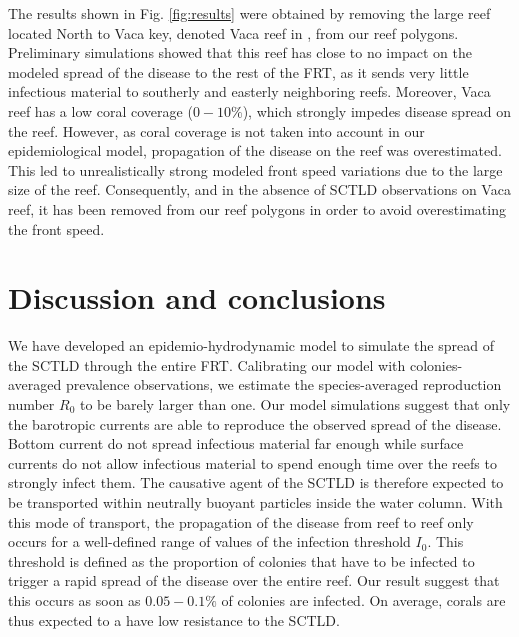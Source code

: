 \documentclass[utf8]{frontiersSCNS}
\begin{document}
The results shown in Fig. \ref{fig:results} were obtained by removing the large reef located North to Vaca key, denoted Vaca reef in \cite{frys20}, from our reef polygons. Preliminary simulations showed that this reef has close to no impact on the modeled spread of the disease to the rest of the FRT, as it sends very little infectious material to southerly and easterly neighboring reefs. Moreover, Vaca reef has a low coral coverage ($0-10\%$), which strongly impedes disease spread on the reef. However, as coral coverage is not taken into account in our epidemiological model, propagation of the disease on the reef was overestimated. This led to unrealistically strong modeled front speed variations due to the large size of the reef. Consequently, and in the absence of SCTLD observations on Vaca reef, it has been removed from our reef polygons in order to avoid overestimating the front speed.



\section{Discussion and conclusions}


We have developed an epidemio-hydrodynamic model to simulate the spread of the SCTLD through the entire FRT. Calibrating our model with colonies-averaged prevalence observations, we estimate the species-averaged reproduction number $R_0$ to be barely larger than one. Our model simulations suggest that only the barotropic currents are able to reproduce the observed spread of the disease. Bottom current do not spread infectious material far enough while surface currents do not allow infectious material to spend enough time over the reefs to strongly infect them. The causative agent of the SCTLD is therefore expected to be transported within neutrally buoyant particles inside the water column. With this mode of transport, the propagation of the disease from reef to reef only occurs for a well-defined range of values of the infection threshold $I_0$. This threshold is defined as the proportion of colonies that have to be infected to trigger a rapid spread of the disease over the entire reef. Our result suggest that this occurs as soon as $0.05-0.1\%$ of colonies are infected. On average, corals are thus expected to a have low resistance to the SCTLD.
\end{document}
